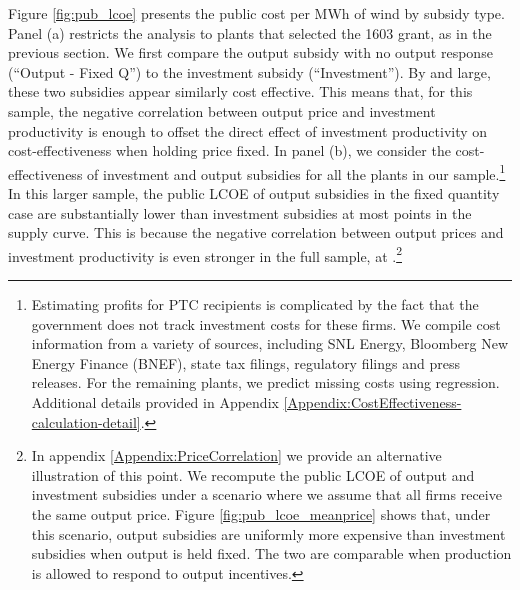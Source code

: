 \documentclass[12pt]{article}
\begin{document}
Figure \ref{fig:pub_lcoe} presents the public cost per MWh of wind by subsidy type. Panel (a) restricts the analysis to plants that selected the 1603 grant, as in the previous section. We first compare the output subsidy with no output response (``Output - Fixed Q'') to the investment subsidy (``Investment''). By and large, these two subsidies appear similarly cost effective. This means that, for this sample, the negative correlation between output price and investment productivity is enough to offset the direct effect of investment productivity on cost-effectiveness when holding price fixed. In panel (b), we consider the cost-effectiveness of investment and output subsidies for all the plants in our sample.\footnote{Estimating profits for PTC recipients is complicated by the fact that the government does not track investment costs for these firms. We compile cost information from a variety of sources, including SNL Energy, Bloomberg New Energy Finance (BNEF), state tax filings, regulatory filings and press releases. For the remaining plants, we predict missing costs using regression. Additional details provided in Appendix \ref{Appendix:CostEffectiveness-calculation-detail}.} In this larger sample, the public LCOE of output subsidies in the fixed quantity case are substantially lower than investment subsidies at most points in the supply curve. This is because the negative correlation between output prices and investment productivity is even stronger in the full sample, at \unskip.\footnote{In appendix \ref{Appendix:PriceCorrelation} we provide an alternative illustration of this point. We recompute the public LCOE of output and investment subsidies under a scenario where we assume that all firms receive the same output price. Figure \ref{fig:pub_lcoe_meanprice} shows that, under this scenario, output subsidies are uniformly more expensive than investment subsidies when output is held fixed. The two are comparable when production is allowed to respond to output incentives.}
\end{document}
